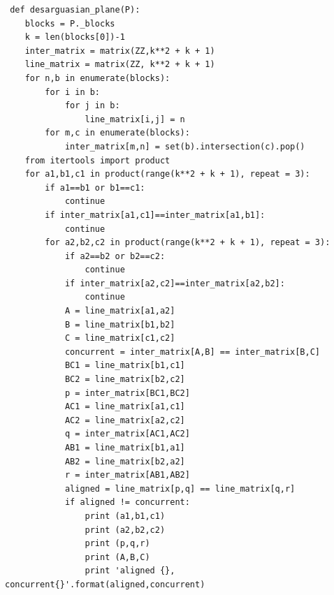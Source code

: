 \documentclass[a4paper]{article}
\begin{document}
\begin{lstlisting}
 def desarguasian_plane(P):
    blocks = P._blocks
    k = len(blocks[0])-1
    inter_matrix = matrix(ZZ,k**2 + k + 1)
    line_matrix = matrix(ZZ, k**2 + k + 1)
    for n,b in enumerate(blocks):
        for i in b:
            for j in b:
                line_matrix[i,j] = n
        for m,c in enumerate(blocks):
            inter_matrix[m,n] = set(b).intersection(c).pop()
    from itertools import product
    for a1,b1,c1 in product(range(k**2 + k + 1), repeat = 3):
        if a1==b1 or b1==c1:
            continue
        if inter_matrix[a1,c1]==inter_matrix[a1,b1]:
            continue
        for a2,b2,c2 in product(range(k**2 + k + 1), repeat = 3):
            if a2==b2 or b2==c2:
                continue
            if inter_matrix[a2,c2]==inter_matrix[a2,b2]:
                continue
            A = line_matrix[a1,a2]
            B = line_matrix[b1,b2]
            C = line_matrix[c1,c2]
            concurrent = inter_matrix[A,B] == inter_matrix[B,C]
            BC1 = line_matrix[b1,c1]
            BC2 = line_matrix[b2,c2]
            p = inter_matrix[BC1,BC2]
            AC1 = line_matrix[a1,c1]
            AC2 = line_matrix[a2,c2]
            q = inter_matrix[AC1,AC2]
            AB1 = line_matrix[b1,a1]
            AB2 = line_matrix[b2,a2]
            r = inter_matrix[AB1,AB2]
            aligned = line_matrix[p,q] == line_matrix[q,r]
            if aligned != concurrent:
                print (a1,b1,c1)
                print (a2,b2,c2)
                print (p,q,r)
                print (A,B,C)
                print 'aligned {}, concurrent{}'.format(aligned,concurrent)
\end{lstlisting}
\end{document}
